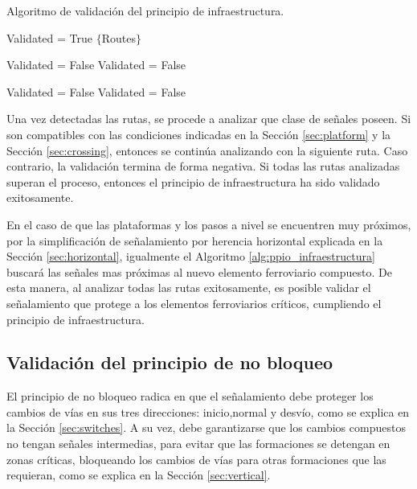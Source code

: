 		\begin{algorithm}[hbt!]
			\caption{Algoritmo de validación del principio de infraestructura.}\label{alg:ppio_infraestructura}
			\DontPrintSemicolon
			\SetNoFillComment
			\LinesNotNumbered 
			Validated = True\;
			$\{$Routes$\}$\; 
			{
				{
					{
						Validated = False\;
					}
					{
						Validated = False\;
					}
				}
				
				{
					{
						Validated = False\;
					}
					{
						Validated = False\;
					}
				}
			}
			
		\end{algorithm}
		
		Una vez detectadas las rutas, se procede a analizar que clase de señales poseen.  Si son compatibles con las condiciones indicadas en la Sección \ref{sec:platform} y la Sección \ref{sec:crossing}, entonces se continúa analizando con la siguiente ruta. Caso contrario, la validación termina de forma negativa. Si todas las rutas analizadas superan el proceso, entonces el principio de infraestructura ha sido validado exitosamente.
		
		En el caso de que las plataformas y los pasos a nivel se encuentren muy próximos, por la simplificación de señalamiento por herencia horizontal explicada en la Sección \ref{sec:horizontal}, igualmente el Algoritmo \ref{alg:ppio_infraestructura} buscará las señales mas próximas al nuevo elemento ferroviario compuesto. De esta manera, al analizar todas las rutas exitosamente, es posible validar el señalamiento que protege a los elementos ferroviarios críticos, cumpliendo el principio de infraestructura.
		
	\subsection{Validación del principio de no bloqueo}
		
		El principio de no bloqueo radica en que el señalamiento debe proteger los cambios de vías en sus tres direcciones: inicio,normal y desvío, como se explica en la Sección \ref{sec:switches}. A su vez, debe garantizarse que los cambios compuestos no tengan señales intermedias, para evitar que las formaciones se detengan en zonas críticas, bloqueando los cambios de vías para otras formaciones que las requieran, como se explica en la Sección \ref{sec:vertical}.
		
